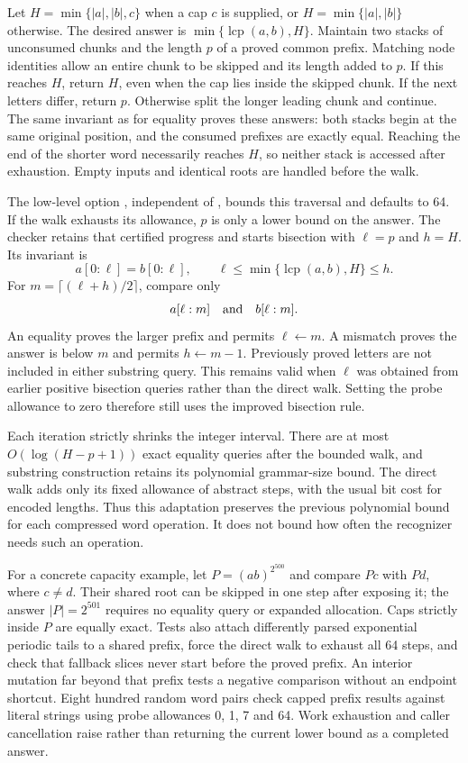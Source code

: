 Let $H=\min\{|a|,|b|,c\}$ when a cap $c$ is supplied, or
$H=\min\{|a|,|b|\}$ otherwise. The desired answer is
$\min\{\operatorname{lcp}(a,b),H\}$. Maintain two stacks of unconsumed
chunks and the length $p$ of a proved common prefix. Matching node
identities allow an entire chunk to be skipped and its length added to
$p$. If this reaches $H$, return $H$, even when the cap lies inside the
skipped chunk. If the next letters differ, return $p$. Otherwise split
the longer leading chunk and continue. The same invariant as for equality
proves these answers: both stacks begin at the same original position,
and the consumed prefixes are exactly equal. Reaching the end of the
shorter word necessarily reaches $H$, so neither stack is accessed after
exhaustion. Empty inputs and identical roots are handled before the walk.

The low-level option , independent of
, bounds this traversal and defaults to 64.
If the walk exhausts its allowance, $p$ is only a lower bound on the
answer. The checker retains that certified progress and starts bisection
with $\ell=p$ and $h=H$. Its invariant is
\[
 a[0:\ell]=b[0:\ell],\qquad
 \ell\le\min\{\operatorname{lcp}(a,b),H\}\le h.
\]
For $m=\lceil(\ell+h)/2\rceil$, compare only
\[
 a[\ell:m]\quad\hbox{and}\quad b[\ell:m].
\]
An equality proves the larger prefix and permits $\ell\gets m$.
A mismatch proves the answer is below $m$ and permits $h\gets m-1$.
Previously proved letters are not included in either substring query.
This remains valid when $\ell$ was obtained from earlier positive
bisection queries rather than the direct walk. Setting the probe allowance
to zero therefore still uses the improved bisection rule.

Each iteration strictly shrinks the integer interval. There are at most
$O(\log(H-p+1))$ exact equality queries after the bounded walk, and
substring construction retains its polynomial grammar-size bound. The
direct walk adds only its fixed allowance of abstract steps, with the
usual bit cost for encoded lengths. Thus this adaptation preserves the
previous polynomial bound for each compressed word operation. It does not
bound how often the recognizer needs such an operation.

For a concrete capacity example, let $P=(ab)^{2^{500}}$ and compare $Pc$
with $Pd$, where $c\ne d$. Their shared root can be skipped in one step
after exposing it; the answer $|P|=2^{501}$ requires no equality query or
expanded allocation. Caps strictly inside $P$ are equally exact. Tests
also attach differently parsed exponential periodic tails to a shared
prefix, force the direct walk to exhaust all 64 steps, and check that
fallback slices never start before the proved prefix. An interior mutation
far beyond that prefix tests a negative comparison without an endpoint
shortcut. Eight hundred random word pairs check capped prefix results
against literal strings using probe allowances 0, 1, 7 and 64. Work
exhaustion and caller cancellation raise rather than returning the current
lower bound as a completed answer.

